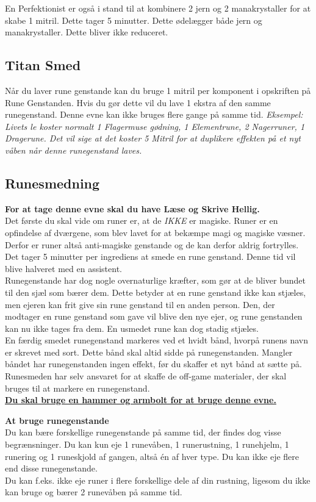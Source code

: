 En Perfektionist er også i stand til at kombinere 2 jern og 2 manakrystaller for at skabe 1 mitril. Dette tager 5 minutter. Dette ødelægger både jern og manakrystaller. Dette bliver ikke reduceret.

\subsection{Titan Smed}
Når du laver rune genstande kan du bruge 1 mitril per komponent i opskriften på Rune Genstanden. Hvis du gør dette vil du lave 1 ekstra af den samme runegenstand. Denne evne kan ikke bruges flere gange på samme tid.
\textit{Eksempel: Livets le koster normalt 1 Flagermuse gødning, 1 Elementrune, 2 Nagerruner, 1 Dragerune. Det vil sige at det koster 5 Mitril for at duplikere effekten på et nyt våben når denne runegenstand laves.}

\subsection{Runesmedning}
\textbf{For at tage denne evne skal du have Læse og Skrive Hellig.}\\
Det første du skal vide om runer er, at de \emph{IKKE} er magiske. Runer er en opfindelse af dværgene, som blev lavet for at bekæmpe magi og magiske væsner. Derfor er runer altså anti-magiske genstande og de kan derfor aldrig fortrylles.\\
Det tager 5 minutter per ingrediens at smede en rune genstand. Denne tid vil blive halveret med en assistent.\\
Runegenstande har dog nogle overnaturlige kræfter, som gør at de bliver bundet til den sjæl som bærer dem. Dette betyder at en rune genstand ikke kan stjæles, men ejeren kan frit give sin rune genstand til en anden person. Den, der modtager en rune genstand som gave vil blive den nye ejer, og rune genstanden kan nu ikke tages fra dem. En usmedet rune kan dog stadig stjæles.\\

En færdig smedet runegenstand markeres ved et hvidt bånd, hvorpå runens navn er skrevet med sort. Dette bånd skal altid sidde på runegenstanden. Mangler båndet har runegenstanden ingen effekt, før du skaffer et nyt bånd at sætte på. Runesmeden har selv ansvaret for at skaffe de off-game materialer, der skal bruges til at markere en runegenstand.\\
\textbf{\underline{Du skal bruge en hammer og armbolt for at bruge denne evne.}}

\textbf{At bruge runegenstande}\\
Du kan bære forskellige runegenstande på samme tid, der findes dog visse begrænsninger. Du kan kun eje 1 runevåben, 1 runerustning, 1 runehjelm, 1 runering og 1 runeskjold af gangen, altså én af hver type. Du kan ikke eje flere end disse runegenstande.\\
Du kan f.eks. ikke eje runer i flere forskellige dele af din rustning, ligesom du ikke kan bruge og bærer 2 runevåben på samme tid.\\

